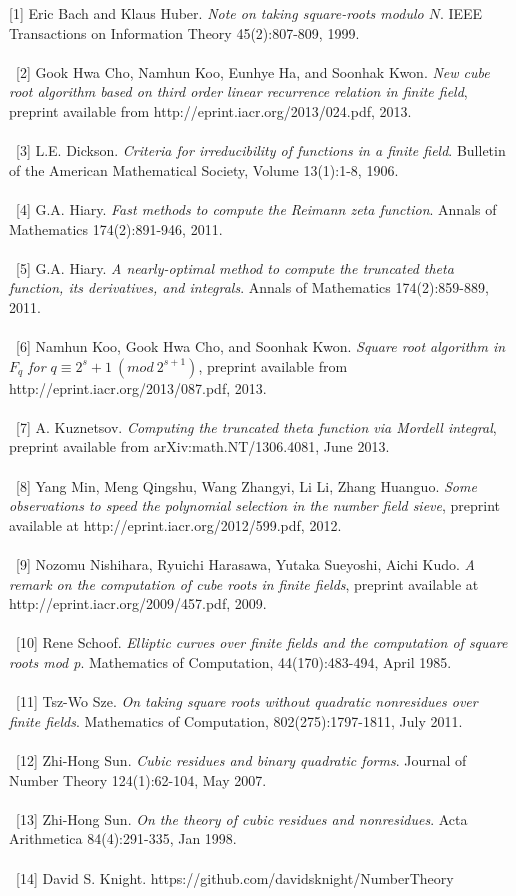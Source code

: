 \documentclass[final,letterpaper,oneside,10pt]{article}
\begin{document}
[1] Eric Bach and Klaus Huber. \textit{Note on taking square-roots modulo $N$}.  IEEE Transactions on Information Theory 45(2):807-809, 1999.
\\
\\
\
[2] Gook Hwa Cho, Namhun Koo, Eunhye Ha, and Soonhak Kwon. \textit{New cube root algorithm based on third order linear recurrence relation in
finite field}, preprint available from http://eprint.iacr.org/2013/024.pdf, 2013.
\\
\\
\
[3] L.E. Dickson. \textit{Criteria for irreducibility of functions in a finite field}.  Bulletin of the American Mathematical Society, Volume 13(1):1-8, 1906.
\\
\\
\
[4] G.A. Hiary. \textit{Fast methods to compute the Reimann zeta function}.  Annals of Mathematics 174(2):891-946, 2011.
\\
\\
\
[5] G.A. Hiary. \textit{A nearly-optimal method to compute the truncated theta function, its derivatives, and integrals}.  Annals of Mathematics 
174(2):859-889, 2011.
\\
\\
\
[6] Namhun Koo, Gook Hwa Cho, and Soonhak Kwon. \textit{Square root algorithm in $F_q$ for $q \equiv 2^s+1~(mod~2^{s+1})$}, preprint available
from 
\\
 http://eprint.iacr.org/2013/087.pdf, 2013.
\\
\\
\
[7]  A. Kuznetsov. \textit{Computing the truncated theta function via Mordell integral}, preprint available from arXiv:math.NT/1306.4081, June 2013.
\\
\\
\
[8] Yang Min, Meng Qingshu, Wang Zhangyi, Li Li, Zhang Huanguo. \textit{Some observations to speed the polynomial selection in the number field
sieve}, preprint available at http://eprint.iacr.org/2012/599.pdf, 2012.
\\
\\
\
[9] Nozomu Nishihara, Ryuichi Harasawa, Yutaka Sueyoshi, Aichi Kudo. \textit{A remark on the computation of cube roots in finite fields}, preprint
available at http://eprint.iacr.org/2009/457.pdf, 2009.
\\
\\
\
[10] Rene Schoof. \textit{Elliptic curves over finite fields and the computation of square roots mod p}.  Mathematics of Computation, 44(170):483-494,
April 1985.
\\
\\
\
[11] Tsz-Wo Sze. \textit{On taking square roots without quadratic nonresidues over finite fields}.  Mathematics of Computation, 802(275):1797-1811, 
July 2011.
\\
\\
\
[12] Zhi-Hong Sun. \textit{Cubic residues and binary quadratic forms}. Journal of Number Theory 124(1):62-104, May 2007.
\\
\\
\
[13]  Zhi-Hong Sun. \textit{On the theory of cubic residues and nonresidues}. Acta Arithmetica 84(4):291-335, Jan 1998.
\\
\\
\
[14] David S. Knight. https://github.com/davidsknight/NumberTheory
\end{document}
